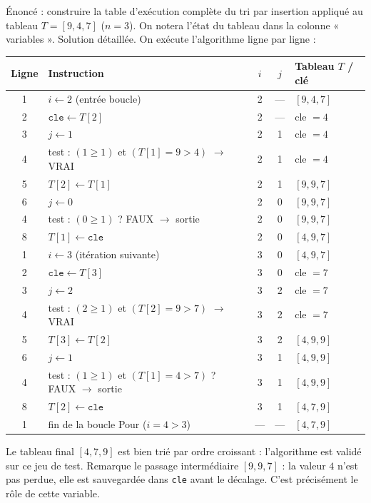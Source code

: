 \documentclass[11pt]{article}
\begin{document}
\begin{exoresolu}
Énoncé : construire la table d'exécution complète du tri par insertion appliqué au tableau $T = [9, 4, 7]$ ($n = 3$). On notera l'état du tableau dans la colonne « variables ».
\tcblower
Solution détaillée. On exécute l'algorithme ligne par ligne :

\begin{center}
\small
\begin{tabularx}{\linewidth}{|c|l|c|c|X|}
\hline
\rowcolor{popgreenL} \textbf{Ligne} & \textbf{Instruction} & $i$ & $j$ & \textbf{Tableau $T$ / clé} \\
\hline
1 & $i \leftarrow 2$ (entrée boucle) & 2 & --- & $[9, 4, 7]$ \\
\hline
2 & $\texttt{cle} \leftarrow T[2]$ & 2 & --- & cle $= 4$ \\
\hline
3 & $j \leftarrow 1$ & 2 & 1 & cle $= 4$ \\
\hline
4 & test : $(1 \ge 1)$ et $(T[1]=9 > 4)$ $\to$ VRAI & 2 & 1 & cle $= 4$ \\
\hline
5 & $T[2] \leftarrow T[1]$ & 2 & 1 & $[9, 9, 7]$ \\
\hline
6 & $j \leftarrow 0$ & 2 & 0 & $[9, 9, 7]$ \\
\hline
4 & test : $(0 \ge 1)$ ? FAUX $\to$ sortie & 2 & 0 & $[9, 9, 7]$ \\
\hline
8 & $T[1] \leftarrow \texttt{cle}$ & 2 & 0 & $[4, 9, 7]$ \\
\hline
1 & $i \leftarrow 3$ (itération suivante) & 3 & 0 & $[4, 9, 7]$ \\
\hline
2 & $\texttt{cle} \leftarrow T[3]$ & 3 & 0 & cle $= 7$ \\
\hline
3 & $j \leftarrow 2$ & 3 & 2 & cle $= 7$ \\
\hline
4 & test : $(2 \ge 1)$ et $(T[2]=9 > 7)$ $\to$ VRAI & 3 & 2 & cle $= 7$ \\
\hline
5 & $T[3] \leftarrow T[2]$ & 3 & 2 & $[4, 9, 9]$ \\
\hline
6 & $j \leftarrow 1$ & 3 & 1 & $[4, 9, 9]$ \\
\hline
4 & test : $(1 \ge 1)$ et $(T[1]=4 > 7)$ ? FAUX $\to$ sortie & 3 & 1 & $[4, 9, 9]$ \\
\hline
8 & $T[2] \leftarrow \texttt{cle}$ & 3 & 1 & $[4, 7, 9]$ \\
\hline
1 & fin de la boucle Pour ($i=4 > 3$) & --- & --- & $[4, 7, 9]$ \\
\hline
\end{tabularx}
\end{center}

Le tableau final $[4, 7, 9]$ est bien trié par ordre croissant : l'algorithme est validé sur ce jeu de test. Remarque le passage intermédiaire $[9, 9, 7]$ : la valeur $4$ n'est pas perdue, elle est sauvegardée dans \texttt{cle} avant le décalage. C'est précisément le rôle de cette variable.
\end{exoresolu}
\end{document}
